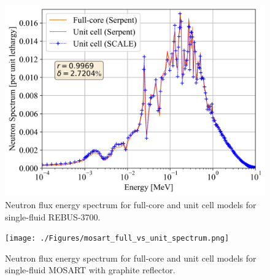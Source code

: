 \documentclass{anstrans}
\begin{document}
\begin{figure}[!htb]
  \centering
  \includegraphics[scale=0.58]{./Figures/rebus_full_vs_unit_spectrum.png}
        \vspace{-0.25in}
  \caption{Neutron flux energy spectrum for full-core and unit cell models for single-fluid REBUS-3700.}   
  \vspace{-0.2in}
  \label{fig:spectrum_rebus}
\end{figure}
\begin{figure}[!htb]
  \centering
  \texttt{[image: ./Figures/mosart\_full\_vs\_unit\_spectrum.png]}
        \vspace{-0.25in}
  \caption{Neutron flux energy spectrum for full-core and unit cell models for single-fluid \gls{MOSART} with graphite reflector.}   
  \label{fig:spectrum_mosart}
  \vspace{-0.1in}
\end{figure}
\end{document}
